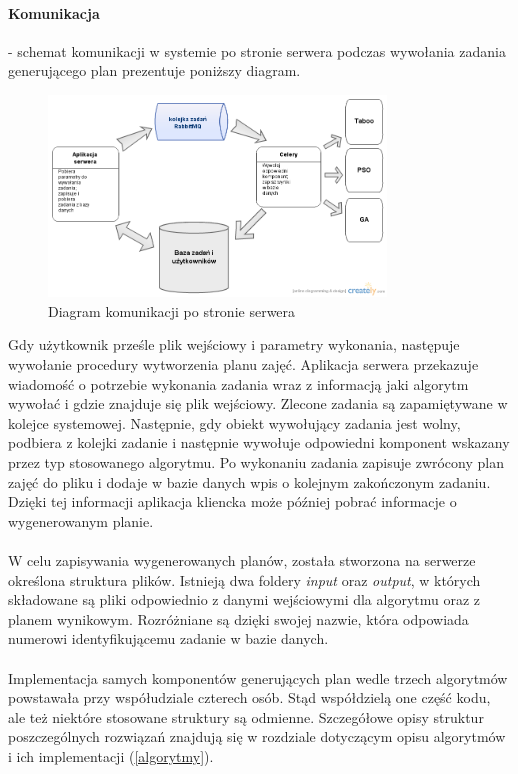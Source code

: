 \paragraph{Komunikacja} - schemat komunikacji w systemie po stronie serwera podczas wywołania zadania generującego plan prezentuje poniższy diagram.
\begin{figure}[H]
  \caption{Diagram komunikacji po stronie serwera}
  \centering
    \includegraphics[width=0.8\textwidth]{img/SystemCommunication.png}
\end{figure}
Gdy użytkownik prześle plik wejściowy i parametry wykonania, następuje wywołanie procedury wytworzenia planu zajęć. Aplikacja serwera przekazuje wiadomość o potrzebie wykonania zadania wraz z informacją jaki algorytm wywołać i gdzie znajduje się plik wejściowy. Zlecone zadania są zapamiętywane w kolejce systemowej. Następnie, gdy obiekt wywołujący zadania jest wolny, podbiera z kolejki zadanie i następnie wywołuje odpowiedni komponent wskazany przez typ stosowanego algorytmu. Po wykonaniu zadania zapisuje zwrócony plan zajęć do pliku i dodaje w bazie danych wpis o kolejnym zakończonym zadaniu. Dzięki tej informacji aplikacja kliencka może później pobrać informacje o wygenerowanym planie.
\paragraph{}W celu zapisywania wygenerowanych planów, została stworzona  na serwerze określona struktura plików. Istnieją dwa foldery \emph{input} oraz \emph{output}, w których składowane są pliki odpowiednio z danymi wejściowymi dla algorytmu oraz z planem wynikowym. Rozróżniane są dzięki swojej nazwie, która odpowiada numerowi identyfikującemu zadanie w bazie danych.
\paragraph{} Implementacja samych komponentów generujących plan wedle trzech algorytmów powstawała przy współudziale czterech osób. Stąd współdzielą one część kodu, ale też niektóre stosowane struktury są odmienne. Szczegółowe opisy struktur poszczególnych rozwiązań znajdują się w rozdziale dotyczącym opisu algorytmów i ich implementacji (\ref{algorytmy}).
